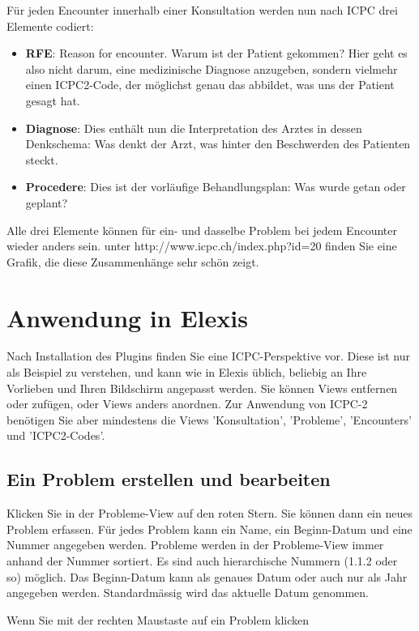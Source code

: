 \documentclass[a4paper]{scrartcl}
\begin{document}
\medskip

Für jeden Encounter innerhalb einer Konsultation werden nun nach ICPC drei Elemente codiert:
\begin{itemize}
\item \textbf{RFE}: Reason for encounter. Warum ist der Patient gekommen? Hier geht es also nicht darum, eine medizinische Diagnose anzugeben, sondern vielmehr einen ICPC2-Code, der möglichst genau das abbildet, was uns der Patient gesagt hat.
\item \textbf{Diagnose}: Dies enthält nun die Interpretation des Arztes in dessen Denkschema: Was denkt der Arzt, was hinter den Beschwerden des Patienten steckt.
\item \textbf{Procedere}: Dies ist der vorläufige Behandlungsplan: Was wurde getan oder geplant?
\end{itemize}

Alle drei Elemente können für ein- und dasselbe Problem bei jedem Encounter wieder anders sein. unter http://www.icpc.ch/index.php?id=20 finden Sie eine Grafik, die diese Zusammenhänge sehr schön zeigt.

\section{Anwendung in Elexis}
Nach Installation des Plugins finden Sie eine ICPC-Perspektive vor. Diese ist nur als Beispiel zu verstehen, und kann wie in Elexis üblich, beliebig an Ihre Vorlieben und Ihren Bildschirm angepasst werden. Sie können Views entfernen oder zufügen, oder Views anders anordnen.
Zur Anwendung von ICPC-2 benötigen Sie aber mindestens die Views 'Konsultation', 'Probleme', 'Encounters' und 'ICPC2-Codes'.

\subsection{Ein Problem erstellen und bearbeiten}
Klicken Sie in der Probleme-View auf den roten Stern. Sie können dann ein neues Problem erfassen. Für jedes Problem kann ein Name, ein Beginn-Datum und eine Nummer angegeben werden. Probleme werden in der Probleme-View immer anhand der Nummer sortiert. Es sind auch hierarchische Nummern (1.1.2 oder so) möglich. Das Beginn-Datum kann als genaues Datum oder auch nur als Jahr angegeben werden. Standardmässig wird das aktuelle Datum genommen.

\medskip

Wenn Sie mit der rechten Maustaste auf ein Problem klicken
\end{document}
